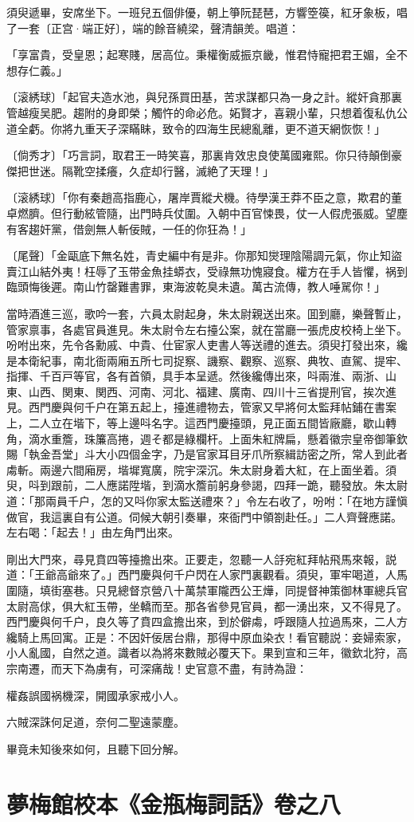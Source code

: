 須臾遞畢，安席坐下。一班兒五個俳優，朝上箏阮琵琶，方響箜篌，紅牙象板，唱了一套〔正宫·端正好〕，端的餘音繞梁，聲清韻羙。唱道：

\begin{myquote}
「享富貴，受皇恩；起寒賤，居高位。秉權衡威振京畿，惟君恃寵把君王媚，全不想存仁義。」

{\markfont〔滚綉球〕}「起官夫造水池，與兒孫買田基，苦求謀都只為一身之計。縱奸貪那裏管越瘦吴肥。趨附的身即榮；觸忤的命必危。妬賢才，喜親小輩，只想着復私仇公道全虧。你將九重天子深瞞眛，致令的四海生民總亂離，更不道天網恢恢！」

{\markfont〔倘秀才〕}「巧言詞，取君王一時笑喜，那裏肯效忠良使萬國雍熙。你只待顛倒豪傑把世迷。隔靴空揉癢，久症却行醫，滅絶了天理！」

{\markfont〔滚綉球〕}「你有秦趙高指鹿心，屠岸賈縱犬機。待學漢王莽不臣之意，欺君的董卓燃臍。但行動絃管隨，出門時兵仗圍。入朝中百官悚畏，仗一人假虎張威。望塵有客趨奸黨，借劍無人斬佞賊，一任的你狂為！」

{\markfont〔尾聲〕}「金甌底下無名姓，青史編中有是非。你那知爕理陰陽調元氣，你止知盜賣江山結外夷！枉辱了玉带金魚挂蟒衣，受祿無功愧寢食。權方在手人皆懼，祸到臨頭悔後遲。南山竹罄難書罪，東海波乾臭未遺。萬古流傳，教人唾駡你！」
\end{myquote}

當時酒進三巡，歌吟一套，六員太尉起身，朱太尉親送出來。囬到廳，樂聲暫止，管家禀事，各處官員進見。朱太尉令左右擡公案，就在當廳一張虎皮校椅上坐下。吩咐出來，先令各勳戚、中貴、仕宦家人吏書人等送禮的進去。須臾打發出來，纔是本衛紀事，南北衙兩廂五所七司捉察、譏察、觀察、巡察、典牧、直駕、提牢、指揮、千百戸等官，各有首領，具手本呈遞。然後纔傳出來，呌兩淮、兩浙、山東、山西、関東、関西、河南、河北、福建、廣南、四川十三省提刑官，挨次進見。西門慶與何千户在第五起上，擡進禮物去，管家又早將何太監拜帖鋪在書案上，二人立在堦下，等上邊呌名字。這西門慶擡頭，見正面五間皆廠廳，歇山轉角，滴水重簷，珠簾高捲，週そ都是綠欄杆。上面朱紅牌扁，懸着徽宗皇帝御筆欽賜「執金吾堂」斗大小四個金字，乃是官家耳目牙爪所察緝訪密之所，常人到此者䖏斬。兩邊六間廂房，堦墀寬廣，院宇深沉。朱太尉身着大紅，在上面坐着。須臾，呌到跟前，二人應諾陞堦，到滴水簷前躬身參謁，四拜一跪，聽發放。朱太尉道：「那兩員千户，怎的又呌你家太監送禮來？」令左右收了，吩咐：「在地方謹愼做官，我這裏自有公道。伺候大朝引奏畢，來衙門中領劄赴任。」二人齊聲應諾。左右喝：「起去！」由左角門出來。

剛出大門來，尋見賁四等擡擔出來。正要走，忽聽一人㧱宛紅拜帖飛馬來報，説道：「王爺高爺來了。」西門慶與何千户閃在人家門裏觀看。須臾，軍牢喝道，人馬圍隨，填街塞巷。只見總督京營八十萬禁軍隴西公王燁，同提督神策御林軍總兵官太尉高俅，俱大紅玉帶，坐轎而至。那各省參見官員，都一湧出來，又不得見了。西門慶與何千户，良久等了賁四盒擔出來，到於僻䖏，呼跟隨人拉過馬來，二人方纔騎上馬回寓。正是：不因奸佞居台鼎，那得中原血染衣！看官聽説：妾婦索家，小人亂國，自然之道。識者以為將來數賊必覆天下。果到宣和三年，徽欽北狩，高宗南遷，而天下為虜有，可深痛哉！史官意不盡，有詩為證：

\begin{myquote}
權姦誤國祸機深，開國承家戒小人。

六賊深誅何足道，奈何二聖遠蒙塵。
\end{myquote}

畢竟未知後來如何，且聽下回分解。

\part*{夢梅館校本《金瓶梅詞話》卷之八}

